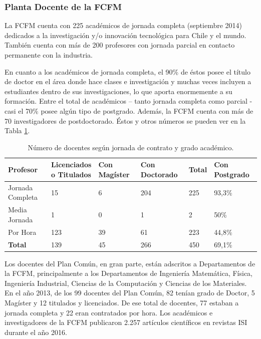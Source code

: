 \subsubsection{Planta Docente de la FCFM}

La FCFM cuenta con 225 académicos de jornada completa (septiembre 2014) dedicados a la
investigación y/o innovación tecnológica para Chile y el mundo. También cuenta con más de
200 profesores con jornada parcial en contacto permanente con la industria.

En cuanto a los académicos de jornada completa, el 90\% de éstos posee el título de doctor
en el área donde hace clases e investigación y muchas veces incluyen a estudiantes dentro de sus
investigaciones, lo que aporta enormemente a su formación.
Entre el total de académicos – tanto jornada completa como parcial - casi el 70\% posee algún
tipo de postgrado. Además, la FCFM cuenta con más de 70 investigadores de postdoctorado. Éstos
y otros números se pueden ver en la Tabla \ref{jor_vs_grados}.

\begin{table}[ht!]
\centering
\caption{Número de docentes según jornada de contrato y grado académico.}
\label{jor_vs_grados}
\begin{tabular}{llllll}
\hline
Profesor         & \shortstack{Licenciados \\ o Titulados} 	& Con Magíster & Con Doctorado & Total & Con Postgrado \\ \hline \hline
Jornada Completa & 15	& 6 & 204 & 225 & 93,3\%          \\ \hline
Media Jornada    & 1 & 0 & 1 & 2 & 50\%          \\ \hline
Por Hora         & 123 & 39 & 61 & 223 & 44,8\%          \\ \hline
\textbf{Total}   & 139 & 45 & 266 & 450 & 69,1\%          \\ \hline
\end{tabular}
\end{table}

Los docentes del Plan Común, en gran parte, están adscritos a Departamentos de la FCFM,
principalmente a los Departamentos de Ingeniería Matemática, Física, Ingeniería Industrial,
Ciencias de la Computación y Ciencias de los Materiales. En el año 2013, de los 99 docentes
del Plan Común, 82 tenían grado de Doctor, 5 Magíster y 12 titulados y licenciados. De ese total
de docentes, 77 estaban a jornada completa y 22 eran contratados por hora.
Los académicos e investigadores de la FCFM publicaron 2.257 artículos científicos en revistas
ISI durante el año 2016. 


